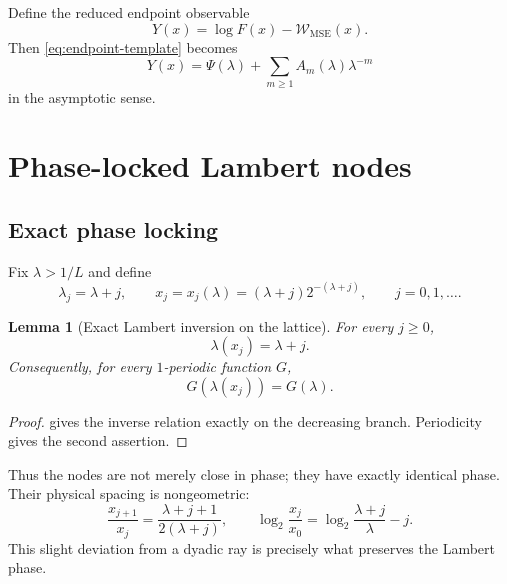 \documentclass[11pt]{article}
\newtheorem{lemma}[theorem]{Lemma}
\theoremstyle{definition}
\theoremstyle{remark}
\begin{document}
Define the reduced endpoint observable
\begin{equation}
Y(x)=\log F(x)-\mathcal W_{\mathrm{MSE}}(x).
\label{eq:Y}
\end{equation}
Then \cref{eq:endpoint-template} becomes
\begin{equation}
Y(x)=\Psi(\lambda)+\sum_{m\ge1}A_m(\lambda)\lambda^{-m}
\label{eq:Y-expansion}
\end{equation}
in the asymptotic sense.

\section{Phase-locked Lambert nodes}
\label{sec:lambert}

\subsection{Exact phase locking}

Fix $\lambda>1/L$ and define
\begin{equation}
\lambda_j=\lambda+j,
\qquad
x_j=x_j(\lambda)=(\lambda+j)2^{-(\lambda+j)},
\qquad j=0,1,\ldots.
\label{eq:phase-nodes}
\end{equation}

\begin{lemma}[Exact Lambert inversion on the lattice]
\label{lem:phase-lock}
For every $j\ge0$,
\begin{equation}
\lambda(x_j)=\lambda+j.
\label{eq:phase-inverse}
\end{equation}
Consequently, for every $1$-periodic function $G$,
\begin{equation}
G(\lambda(x_j))=G(\lambda).
\label{eq:periodic-lock}
\end{equation}
\end{lemma}

\begin{proof}
 gives the inverse relation exactly on the decreasing branch. Periodicity gives the second assertion.
\end{proof}

Thus the nodes are not merely close in phase; they have exactly identical phase. Their physical spacing is nongeometric:
\begin{equation}
\frac{x_{j+1}}{x_j}
=\frac{\lambda+j+1}{2(\lambda+j)},
\qquad
\log_2\frac{x_j}{x_0}
=\log_2\frac{\lambda+j}{\lambda}-j.
\label{eq:x-spacing}
\end{equation}
This slight deviation from a dyadic ray is precisely what preserves the Lambert phase.
\end{document}
